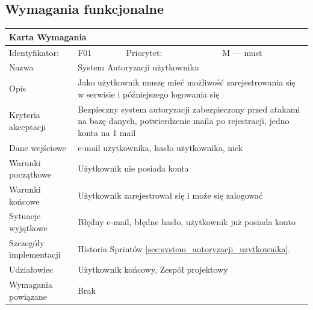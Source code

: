 \documentclass[a4paper,11pt]{report}
\begin{document}
	\subsection {Wymagania funkcjonalne}
		\begin{tabular}{|p{3cm}|p{2cm}|p{2cm}|p{6cm}|}
		\hline
		\multicolumn{4}{|p{12 cm}|}{Karta Wymagania}\\
		\hline
		Identyfikator: & F01 & Priorytet: & M — must\\
		\hline
		Nazwa & \multicolumn{3}{|p{10 cm}|}{System Autoryzacji użytkownika}\\
		\hline
		Opis & \multicolumn{3}{|p{10 cm}|}{Jako użytkownik muszę mieć możliwość zarejestrowania się w serwisie i późniejszego logowania się}\\
		\hline
		Kryteria akceptacji & \multicolumn{3}{|p{10 cm}|}{Bezpieczny system autoryzacji zabezpieczony przed atakami na bazę danych, potwierdzenie maila po rejestracji,  jedno konta na 1 mail}\\
		\hline
		Dane wejściowe & \multicolumn{3}{|p{10 cm}|}{e-mail użytkownika, hasło użytkownika, nick}\\
		\hline
		Warunki początkowe & \multicolumn{3}{|p{10 cm}|}{Użytkownik nie posiada konta}\\
		\hline
		Warunki końcowe & \multicolumn{3}{|p{10 cm}|}{Użytkownik zarejestrował się i może się zalogować}\\
		\hline
		Sytuacje wyjątkowe & \multicolumn{3}{|p{10 cm}|}{Błędny e-mail, błędne hasło, użytkownik już posiada konto}\\
		\hline
		Szczegóły implementacji & \multicolumn{3}{|p{10 cm}|}{Historia Sprintów \ref{sec:system_autoryzacji_uzytkownika}.}\\
		\hline
		Udziałowiec & \multicolumn{3}{|p{10 cm}|}{Użytkownik końcowy, Zespół projektowy}\\
		\hline
		Wymagania powiązane & \multicolumn{3}{|p{10 cm}|}{Brak}\\
		\hline
		\end{tabular}
		\newline
		\vspace*{0,2 cm}
		\newline
\end{document}
